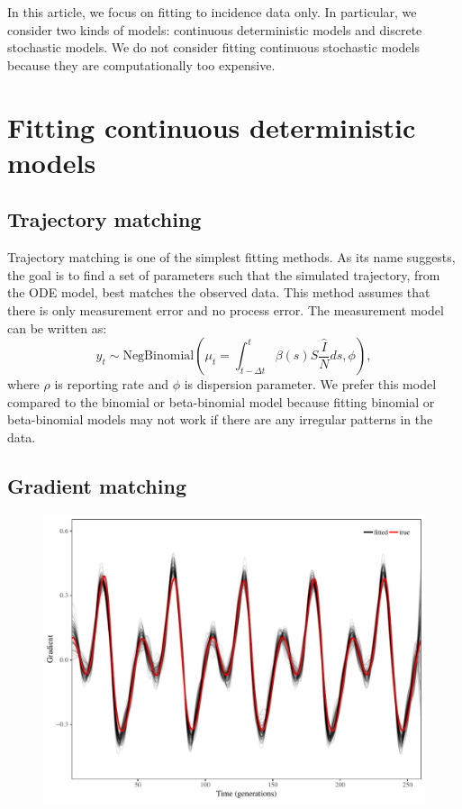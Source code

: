 \documentclass{article}
\begin{document}
In this article, we focus on fitting to incidence data only.
In particular, we consider two kinds of models: continuous deterministic models and discrete stochastic models.
We do not consider fitting continuous stochastic models because they are computationally too expensive.

\section{Fitting continuous deterministic models}

\subsection{Trajectory matching}

Trajectory matching is one of the simplest fitting methods.
As its name suggests, the goal is to find a set of parameters such that the simulated trajectory, from the ODE model, best matches the observed data.
This method assumes that there is only measurement error and no process error.
The measurement model can be written as:
\begin{equation}
y_t \sim \mathrm{NegBinomial}\left(\mu_t= \int_{t-\Delta t}^{t} \beta(s) S \frac{\hat{I}}{N} ds, \phi \right),
\end{equation}
where $\rho$ is reporting rate and $\phi$ is dispersion parameter.
We prefer this model compared to the binomial or beta-binomial model because fitting binomial or beta-binomial models may not work if there are any irregular patterns in the data.

\subsection{Gradient matching}

\begin{figure}[t]
\includegraphics[width=\textwidth]{../figure/gradient_matching_sinusoidal.pdf}
\end{figure}
\end{document}
